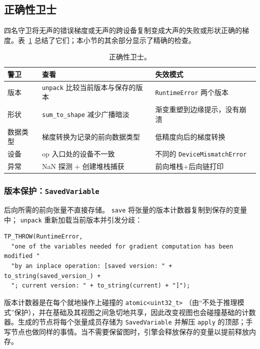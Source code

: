 \subsection{正确性卫士}
\label{subsec:eval-guards}

四名守卫将无声的错误梯度或无声的跨设备复制变成大声的失败或形状正确的梯度。表~\ref{tab:guards} 总结了它们；本小节的其余部分显示了精确的检查。

\begin{table}[H]
\centering
\caption{正确性卫士。}
\label{tab:guards}
\small
\begin{tabular}{lll}
\toprule
警卫 & 查看 & 失效模式 \\
\midrule
版本 & \texttt{unpack} 比较当前版本与保存的版本 & \texttt{RuntimeError} 两个版本 \\
形状 & \texttt{sum\_to\_shape} 减少广播暗淡 & 渐变重塑到边缘提示，没有崩溃 \\
数据类型 & 梯度转换为记录的前向数据类型 & 低精度向后的梯度转换 \\
设备 & op 入口处的设备不一致 & 不同的 \texttt{DeviceMismatchError} \\
异常 & NaN 探测 + 创建堆栈捕获 & 前向堆栈+后向链打印 \\
\bottomrule
\end{tabular}
\end{table}

\subsubsection{版本保护：\texttt{SavedVariable}}

后向所需的前向张量不直接存储。 \texttt{save} 将张量的版本计数器复制到保存的变量中； \texttt{unpack} 重新加载当前版本并引发分歧：

\begin{lstlisting}[caption={Version mismatch is loud: the message spells both versions.}, label=lst:savedvar-eval]
TP_THROW(RuntimeError,
  "one of the variables needed for gradient computation has been modified "
  "by an inplace operation: [saved version: " + to_string(saved_version_) +
  "; current version: " + to_string(current) + "]");
\end{lstlisting}

版本计数器是在每个就地操作上碰撞的 \texttt{atomic<uint32\_t>} （由“不处于推理模式”保护），并在基础及其视图之间急切地共享，因此改变视图也会碰撞基础的计数器。生成的节点将每个张量成员存储为 \texttt{SavedVariable} 并解压 \texttt{apply} 的顶部；手写节点也做同样的事情。当不需要保留图时，引擎会释放保存的变量以提前释放内存。


